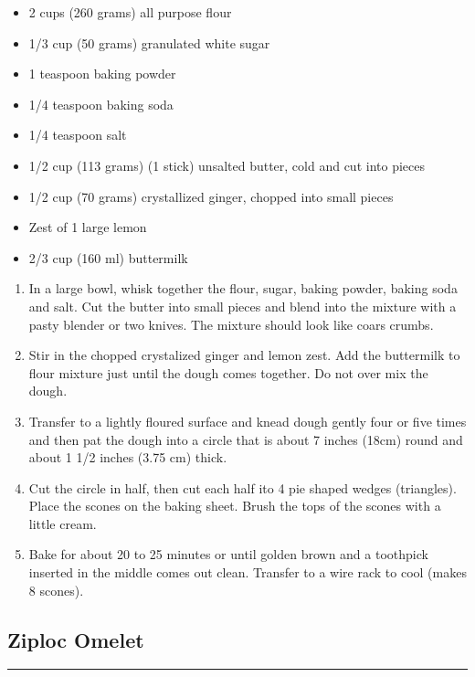 \documentclass{article}
\begin{document}
\begin{framed}
    \begin{itemize}
        \item 2 cups (260 grams) all purpose flour
        \item 1/3 cup (50 grams) granulated white sugar
        \item 1 teaspoon baking powder
        \item 1/4 teaspoon baking soda
        \item 1/4 teaspoon salt
        \item 1/2 cup (113 grams) (1 stick) unsalted butter, cold and cut into pieces
        \item 1/2 cup (70 grams) crystallized ginger, chopped into small pieces
        \item Zest of 1 large lemon
        \item 2/3 cup (160 ml) buttermilk
    \end{itemize}
\end{framed}

\begin{enumerate}
    \item 
        In a large bowl, whisk together the flour, sugar, baking powder, baking soda and salt. Cut the butter into small pieces and blend into the mixture with a pasty blender or two knives. The mixture should look like coars crumbs.
    \item 
        Stir in the chopped crystalized ginger and lemon zest. Add the buttermilk to flour mixture just until the dough comes together. Do not over mix the dough.
    \item
        Transfer to a lightly floured surface and knead dough gently four or five times and then pat the dough into a circle that is about 7 inches (18cm) round and about 1 1/2 inches (3.75 cm) thick. 
    \item
        Cut the circle in half, then cut each half ito 4 pie shaped wedges (triangles). Place the scones on the baking sheet. Brush the tops of the scones with a little cream.
    \item
        Bake for about 20 to 25 minutes or until golden brown and a toothpick inserted in the middle comes out clean. Transfer to a wire rack to cool (makes 8 scones).
\end{enumerate}
\newpage

\subsection{Ziploc Omelet} 
\noindent\rule[0.5ex]{\linewidth}{1pt}
\end{document}
